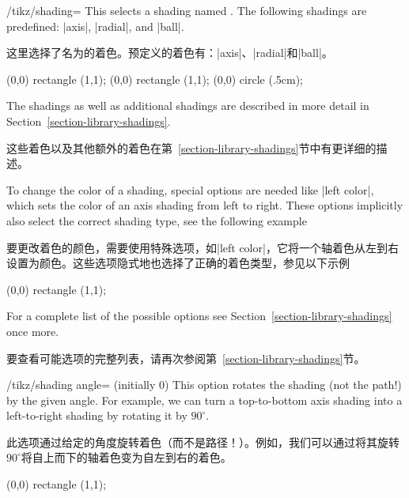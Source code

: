 \begin{key}{/tikz/shading=}
    This selects a shading named . The following shadings are
    predefined: |axis|, |radial|, and |ball|.

    这里选择了名为的着色。预定义的着色有：|axis|、|radial|和|ball|。

\begin{codeexample}[]
\tikz \shadedraw [shading=axis] (0,0) rectangle (1,1);
\tikz \shadedraw [shading=radial] (0,0) rectangle (1,1);
\tikz \shadedraw [shading=ball] (0,0) circle (.5cm);
\end{codeexample}

    The shadings as well as additional shadings are described in more detail in
    Section~\ref{section-library-shadings}.

    这些着色以及其他额外的着色在第~\ref{section-library-shadings}节中有更详细的描述。



    To change the color of a shading, special options are needed like
    |left color|, which sets the color of an axis shading from left to right.
    These options implicitly also select the correct shading type, see the
    following example

    要更改着色的颜色，需要使用特殊选项，如|left color|，它将一个轴着色从左到右设置为颜色。这些选项隐式地也选择了正确的着色类型，参见以下示例

\begin{codeexample}[]
\tikz \shadedraw [left color=red,right color=blue]
    (0,0) rectangle (1,1);
\end{codeexample}

    For a complete list of the possible options see
    Section~\ref{section-library-shadings} once more.

    要查看可能选项的完整列表，请再次参阅第~\ref{section-library-shadings}节。



    \begin{key}{/tikz/shading angle= (initially 0)}
        This option rotates the shading (not the path!) by the given angle. For
        example, we can turn a top-to-bottom axis shading into a left-to-right
        shading by rotating it by $90^\circ$.

        此选项通过给定的角度旋转着色（而不是路径！）。例如，我们可以通过将其旋转$90^\circ$将自上而下的轴着色变为自左到右的着色。

\begin{codeexample}[]
\tikz \shadedraw [shading=axis,shading angle=90] (0,0) rectangle (1,1);
\end{codeexample}
    \end{key}
\end{key}

